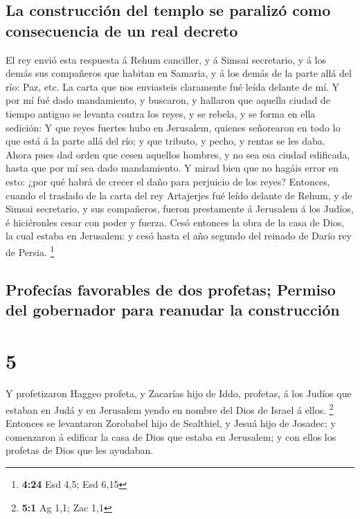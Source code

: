 \hypertarget{la-construcciuxf3n-del-templo-se-paralizuxf3-como-consecuencia-de-un-real-decreto}{%
\subsection{La construcción del templo se paralizó como consecuencia de
un real
decreto}\label{la-construcciuxf3n-del-templo-se-paralizuxf3-como-consecuencia-de-un-real-decreto}}

 El rey envió esta respuesta á Rehum canciller, y á
Simsai secretario, y á los demás sus compañeros que habitan en Samaria,
y á los demás de la parte allá del río: Paz, etc.  La
carta que nos enviasteis claramente fué leída delante de mí.
 Y por mí fué dado mandamiento, y buscaron, y hallaron
que aquella ciudad de tiempo antiguo se levanta contra los reyes, y se
rebela, y se forma en ella sedición:  Y que reyes fuertes
hubo en Jerusalem, quienes señorearon en todo lo que está á la parte
allá del río; y que tributo, y pecho, y rentas se les daba.
 Ahora pues dad orden que cesen aquellos hombres, y no
sea esa ciudad edificada, hasta que por mí sea dado mandamiento.
 Y mirad bien que no hagáis error en esto: ¿por qué habrá
de crecer el daño para perjuicio de los reyes?  Entonces,
cuando el traslado de la carta del rey Artajerjes fué leído delante de
Rehum, y de Simsai secretario, y sus compañeros, fueron prestamente á
Jerusalem á los Judíos, é hiciéronles cesar con poder y fuerza.
 Cesó entonces la obra de la casa de Dios, la cual estaba
en Jerusalem: y cesó hasta el año segundo del reinado de Darío rey de
Persia. \footnote{\textbf{4:24} Esd 4,5; Esd 6,15}

\hypertarget{profecuxedas-favorables-de-dos-profetas-permiso-del-gobernador-para-reanudar-la-construcciuxf3n}{%
\subsection{Profecías favorables de dos profetas; Permiso del gobernador
para reanudar la
construcción}\label{profecuxedas-favorables-de-dos-profetas-permiso-del-gobernador-para-reanudar-la-construcciuxf3n}}

\hypertarget{section-4}{%
\section{5}\label{section-4}}

 Y profetizaron Haggeo profeta, y Zacarías hijo de Iddo,
profetas, á los Judíos que estaban en Judá y en Jerusalem yendo en
nombre del Dios de Israel á ellos. \footnote{\textbf{5:1} Ag 1,1; Zac
  1,1}  Entonces se levantaron Zorobabel hijo de
Sealthiel, y Jesuá hijo de Josadec; y comenzaron á edificar la casa de
Dios que estaba en Jerusalem; y con ellos los profetas de Dios que les
ayudaban.

